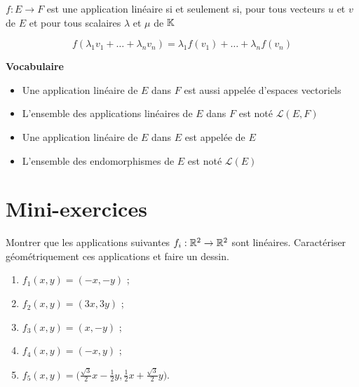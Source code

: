 \begin{frame}



\begin{proposition}%
$f : E \longrightarrow F$ est une 
application linéaire si et seulement si, 
pour tous vecteurs $u$ et $v$ de $E$ et pour tous scalaires  
$\lambda$ et $\mu$ de $\mathbb{K}$
\end{proposition}

\bigskip
\pause

$$f(\lambda_1 v_1 +
\dots + \lambda_n v_n) = \lambda_1 f(v_1) + \dots + \lambda_n
f(v_n)$$

\end{frame}


\begin{frame}  
  

\textbf{Vocabulaire}


\begin{itemize}
  \item Une application linéaire de $E$ dans $F$ est 
  aussi appelée  d'espaces vectoriels
  
  
  \item L'ensemble des applications linéaires de $E$ dans $F$ est noté $\mathcal{L}(E,F)$

  \bigskip
  \pause
  
  \item Une application linéaire de $E$ dans $E$ est appelée  de $E$
  
  
  \item L'ensemble des endomorphismes de $E$ est noté  $\mathcal{L}(E)$
\end{itemize}
\end{frame}




\section{Mini-exercices}

\begin{frame}

\begin{miniexercice}

Montrer que les applications suivantes $f_i : \mathbb{R}^2 \to \mathbb{R}^2$ sont linéaires.
  Caractériser géométriquement ces applications et faire un dessin.
  \begin{enumerate}
    \item $f_1(x,y)=(-x,-y)$ ;
    \item $f_2(x,y) = (3x,3y)$ ;
    \item $f_3(x,y)=(x,-y)$ ;
    \item $f_4(x,y)=(-x,y)$ ;
    \item $f_5(x,y)=\big(\frac{\sqrt 3}{2}x-\frac12y, \frac12x +\frac{\sqrt 3}{2}y\big)$.  
  \end{enumerate}
\end{miniexercice}

\end{frame}

